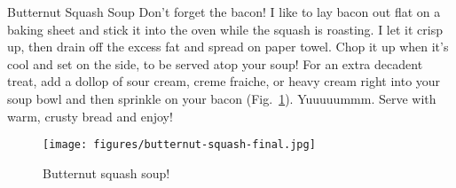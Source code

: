 \begin{entry}{Butternut Squash Soup}
Don't forget the bacon! I like to lay bacon out flat on a baking sheet and stick
it into the oven while the squash is roasting. I let it crisp up, then drain off
the excess fat and spread on paper towel. Chop it up when it's cool and set on
the side, to be served atop your soup! For an extra decadent treat, add a dollop
of sour cream, creme fraiche, or heavy cream right into your soup bowl and then
sprinkle on your bacon (Fig.~\ref{fig:butternut-squash-soup}). Yuuuuummm. Serve
with warm, crusty bread and enjoy!
\begin{figure}
    \centering
    \texttt{[image: figures/butternut-squash-final.jpg]}
    \caption{Butternut squash soup!}
    \label{fig:butternut-squash-soup}
\end{figure}
\end{entry}

